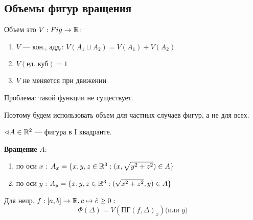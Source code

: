 \subsection*{Объемы фигур вращения}

Объем это $V: Fig\to\mathbb{R}$:
\begin{enumerate}
    \item $V$ --- кон., адд.: $V(A_1\sqcup A_2)=V(A_1)+V(A_2)$
    \item $V(\text{ед. куб})=1$
    \item $V$ не меняется при движении
\end{enumerate}

Проблема: такой функции не существует.

Поэтому будем использовать объем для частных случаев фигур, а не для всех.

\begin{definition}
    $\sphericalangle A\in\mathbb{R}^2$ --- фигура в I квадранте.

    \textbf{Вращение} $A$:
    \begin{enumerate}
        \item по оси $x$ : $A_x=\{x,y,z\in\mathbb{R}^3 : (x,\sqrt{y^2+z^2})\in A\}$
        \item по оси $y$ : $A_y=\{x,y,z\in\mathbb{R}^3 : (\sqrt{x^2+z^2}, y)\in A\}$
    \end{enumerate}
\end{definition}

Для непр. $f:[a,b]\to\mathbb{R}, c\mapsto \tilde c\geq 0:$
$$\Phi(\Delta)=V(\text{ПГ}(f,\Delta)_x) \textit{(или $y$)}$$


